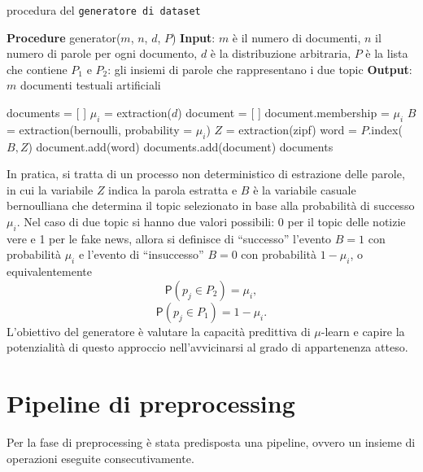 \documentclass[12pt]{report}
\theoremstyle{definition}
\begin{document}
\begin{algorithm}
\caption{procedura del \texttt{generatore di dataset}}
\label{lda}
\hspace*{\algorithmicindent} \textbf{Procedure} generator($m$, $n$, $d$, $P$)
\newline
\hspace*{\algorithmicindent} \textbf{Input}: $m$ è il numero di documenti, $n$ il numero di parole per ogni documento, $d$ è la distribuzione arbitraria, $P$ è la lista che contiene $P_1$ e $P_2$: gli insiemi di parole che rappresentano i due topic
\newline
\hspace*{\algorithmicindent} \textbf{Output}: $m$ documenti testuali artificiali
\begin{algorithmic}[1]
\STATE documents = [ ]
\STATE $\mu_i$ = extraction($d$)
\STATE document = [ ]
\STATE document.membership = $\mu_i$
\STATE $B$ = extraction(bernoulli, probability = $\mu_i$)
\STATE $Z$ = extraction(zipf)
\STATE word = $P$.index($B, Z$)
\STATE document.add(word)
\ENDFOR
\STATE documents.add(document)
\ENDFOR
\RETURN documents
\end{algorithmic}
\end{algorithm}
In pratica, si tratta di un processo non deterministico di estrazione delle parole, in cui la variabile $Z$ indica la parola estratta e $B$ è la variabile casuale bernoulliana che determina il topic selezionato in base alla probabilità di successo $\mu_i$. Nel caso di due topic si hanno due valori possibili: 0 per il topic delle notizie vere e 1 per le fake news, allora si definisce di ``successo'' l'evento $B=1$ con probabilità $\mu_i$ e l'evento di ``insuccesso'' $B=0$ con probabilità $1-\mu_i$, o equivalentemente
\begin{equation}
    \mathsf{P}(p_j \in P_2) = \mu_i,
\end{equation}
\begin{equation}
    \mathsf{P}(p_j \in P_1) = 1 - \mu_i.
\end{equation}
L'obiettivo del generatore è valutare la capacità predittiva di $\mu$-learn e capire la potenzialità di questo approccio nell'avvicinarsi al grado di appartenenza atteso.

\section{Pipeline di preprocessing}\label{pp}
Per la fase di preprocessing è stata predisposta una pipeline, ovvero un insieme di operazioni eseguite consecutivamente.
\end{document}
